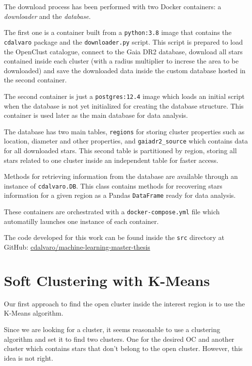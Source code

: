 \documentclass[11pt, a4paper, english]{book}
\begin{document}
The download process has been performed with two Docker containers: a \emph{downloader} and the \emph{database}.

The first one is a container built from a \verb|python:3.8| image that contains the \verb|cdalvaro| package and the \verb|downloader.py| script.
This script is prepared to load the OpenClust catalogue, connect to the Gaia DR2 database, download all stars contained inside each cluster
(with a radius multiplier to increse the area to be downloaded) and save the downloaded data inside the custom database hosted in the second container.

The second container is just a \verb|postgres:12.4| image which loads an initial script when the database is not yet initialized for creating the
database structure. This container is used later as the main database for data analysis.

The database has two main tables, \verb|regions| for storing cluster properties such as location, diameter and other properties, and \verb|gaiadr2_source|
which contains data for all downloaded stars. This second table is partitioned by region, storing all stars related to one cluster inside an independent
table for faster access.

Methods for retrieving information from the database are available through an instance of \verb|cdalvaro.DB|. This class contains methods
for recovering stars information for a given region as a Pandas \verb|DataFrame| ready for data analysis.

These containers are orchestrated with a \verb|docker-compose.yml| file which automatilly launches one instance of each container.

The code developed for this work can be found inside the \verb|src| directory at GitHub:
\href{https://github.com/cdalvaro/machine-learning-master-thesis}{cdalvaro/machine-learning-master-thesis}

\section{Soft Clustering with K-Means}

Our first approach to find the open cluster inside the interest region is to use the K-Means algorithm.

Since we are looking for a cluster, it seems reasonable to use a clustering algorithm and set it to find two clusters.
One for the desired OC and another cluster which contains stars that don't belong to the open cluster.
However, this idea is not right.
\end{document}

